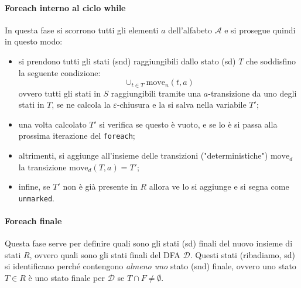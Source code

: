 \documentclass[class=book, crop=false, oneside, 12pt]{standalone}
\begin{document}
\paragraph*{Foreach interno al ciclo while}
In questa fase si scorrono tutti gli elementi \(a\) dell'alfabeto \(\mathcal{A}\) e si prosegue quindi in questo modo:
\begin{itemize}
    \item si prendono tutti gli stati (snd) raggiungibili dallo stato (sd) \(T\) che soddisfino la seguente condizione:
    \begin{equation*}
        \cup_{t \in T} \textrm{move}_n(t,a)
    \end{equation*}
    ovvero tutti gli stati in \(S\) raggiungibili tramite una \(a\)-transizione da uno degli stati in \(T\), se ne calcola la \(\varepsilon\)-chiusura e la si salva nella variabile \(T'\);
    \item una volta calcolato \(T'\) si verifica se questo è vuoto, e se lo è si passa alla prossima iterazione del \texttt{foreach};
    \item altrimenti, si aggiunge all'insieme delle transizioni ("deterministiche") \(\textrm{move}_d\) la transizione \(\textrm{move}_d(T, a) = T'\);
    \item infine, se \(T'\) non è già presente in \(R\) allora ve lo si aggiunge e si segna come \texttt{unmarked}.
\end{itemize}

\paragraph*{Foreach finale}
Questa fase serve per definire quali sono gli stati (sd) finali del nuovo insieme di stati \(R\), ovvero quali sono gli stati finali del DFA \(\mathcal{D}\). Questi stati (ribadiamo, sd) si identificano perché contengono \emph{almeno uno} stato (snd) finale, ovvero uno stato \(T \in R\) è uno stato finale per \(\mathcal{D}\) se \(T \cap F \neq \emptyset\).
\end{document}
